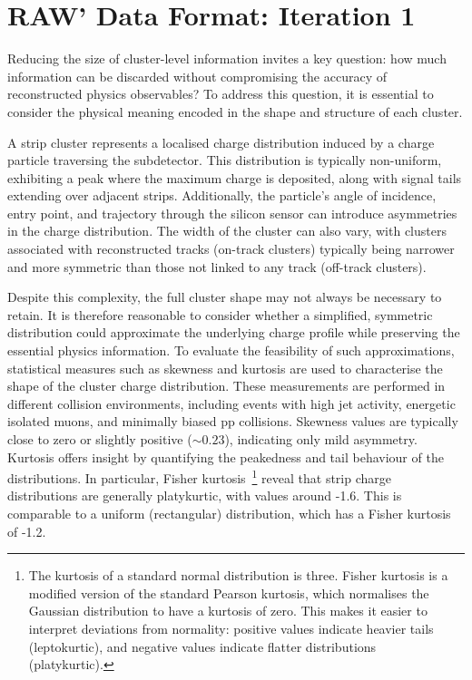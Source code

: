 \section{RAW' Data Format: Iteration 1}
\label{Section:Chapter5-RAW'_Iteration_1}
Reducing the size of cluster-level information invites a key question: how much information can be discarded without compromising the accuracy of reconstructed physics observables? To address this question, it is essential to consider the physical meaning encoded in the shape and structure of each cluster. 

A strip cluster represents a localised charge distribution induced by a charge particle traversing the subdetector. This distribution is typically non-uniform, exhibiting a peak where the maximum charge is deposited, along with signal tails extending over adjacent strips. Additionally, the particle's angle of incidence, entry point, and trajectory through the silicon sensor can introduce asymmetries in the charge distribution. The width of the cluster can also vary, with clusters associated with reconstructed tracks (on-track clusters) typically being narrower and more symmetric than those not linked to any track (off-track clusters).

Despite this complexity, the full cluster shape may not always be necessary to retain. It is therefore reasonable to consider whether a simplified, symmetric distribution could approximate the underlying charge profile while preserving the essential physics information. To evaluate the feasibility of such approximations, statistical measures such as skewness and kurtosis are used to characterise the shape of the cluster charge distribution. These measurements are performed in different collision environments, including events with high jet activity, energetic isolated muons, and minimally biased pp collisions. Skewness values are typically close to zero or slightly positive ($\sim 0.23$), indicating only mild asymmetry. Kurtosis offers insight by quantifying the peakedness and tail behaviour of the distributions. In particular, Fisher kurtosis~\cite{Kurtosis}\footnote{The kurtosis of a standard normal distribution is three. Fisher kurtosis is a modified version of the standard Pearson kurtosis, which normalises the Gaussian distribution to have a kurtosis of zero. This makes it easier to interpret deviations from normality: positive values indicate heavier tails (leptokurtic), and negative values indicate flatter distributions (platykurtic).} reveal that strip charge distributions are generally platykurtic, with values around -1.6. This is comparable to a uniform (rectangular) distribution, which has a Fisher kurtosis of -1.2.

